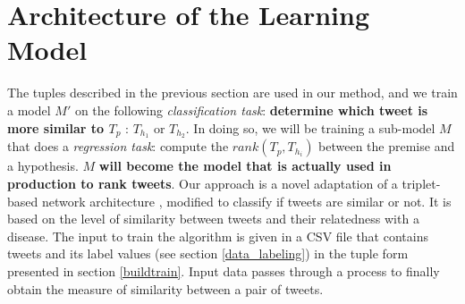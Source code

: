 \documentclass[12pt]{report}
\begin{document}
%
%
%
%
%

\section{Architecture of the Learning Model}\label{models}
The tuples described in the previous section are used in our method, and we train a model $M'$ on the following {\em classification task}: 
{\bf determine which tweet is more similar to $T_p$} : 
$T_{h_1}$ or $T_{h_2}$. In doing so, we will be training a sub-model $M$ that does a {\em regression task}: compute the $rank(T_p, T_{h_i})$ between the 
premise and a hypothesis. $M$ {\bf will become the model that is actually used in production to rank tweets}. 
Our approach  is a novel adaptation of a triplet-based network architecture \cite {Wang2014}, modified to classify if tweets are similar or not. It is based on the level of similarity between tweets and their relatedness with a disease.  
The input to train the algorithm is given in a \ac{CSV} file that contains tweets and its label values (see section \ref{data_labeling}) in the tuple form presented in section \ref{buildtrain}. Input data passes through a process to finally obtain the measure of similarity between a pair of tweets. 
\end{document}
